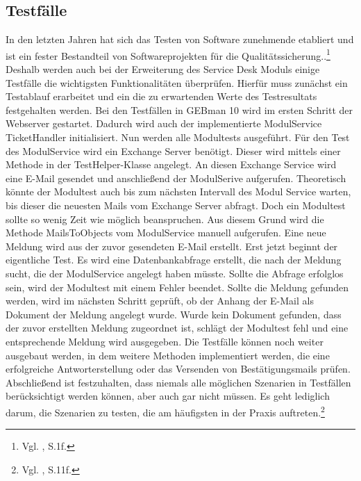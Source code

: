 \subsection{Testfälle}
\noindent
In den letzten Jahren hat sich das Testen von Software zunehmende etabliert und ist ein fester Bestandteil von Softwareprojekten für die Qualitätssicherung..\footnote{Vgl.\citeauthor{Vivenzio} \citeyear{Vivenzio}, S.1f.} Deshalb werden auch bei der Erweiterung des Service Desk Moduls einige Testfälle die wichtigsten Funktionalitäten überprüfen. Hierfür muss zunächst ein Testablauf erarbeitet und ein die zu erwartenden Werte des Testresultats festgehalten werden.\newline
Bei den Testfällen in GEBman 10 wird im ersten Schritt der Webserver gestartet. Dadurch wird auch der implementierte ModulService TicketHandler initialisiert. Nun werden alle Modultests ausgeführt. Für den Test des ModulService wird ein Exchange Server benötigt. Dieser wird mittels einer Methode in der TestHelper-Klasse angelegt. An diesen Exchange Service wird eine E-Mail gesendet und anschließend der ModulSerive aufgerufen. Theoretisch könnte der Modultest auch bis zum nächsten Intervall des Modul Service warten, bis dieser die neuesten Mails vom Exchange Server abfragt. Doch ein Modultest sollte so wenig Zeit wie möglich beanspruchen. Aus diesem Grund wird die Methode MailsToObjects vom ModulService manuell aufgerufen. Eine neue Meldung wird aus der zuvor gesendeten E-Mail erstellt. Erst jetzt beginnt der eigentliche Test. Es wird eine Datenbankabfrage erstellt, die nach der Meldung sucht, die der ModulService angelegt haben müsste. Sollte die Abfrage erfolglos sein, wird der Modultest mit einem Fehler beendet. Sollte die Meldung gefunden werden, wird im nächsten Schritt geprüft, ob der Anhang der E-Mail als Dokument der Meldung angelegt wurde. Wurde kein Dokument gefunden, dass der zuvor erstellten Meldung zugeordnet ist, schlägt der Modultest fehl und eine entsprechende Meldung wird ausgegeben.\newline
Die Testfälle können noch weiter ausgebaut werden, in dem weitere Methoden implementiert werden, die eine erfolgreiche Antworterstellung oder das Versenden von Bestätigungsmails prüfen. Abschließend ist festzuhalten, dass niemals alle möglichen Szenarien in Testfällen berücksichtigt werden können, aber auch gar nicht müssen. Es geht lediglich darum, die Szenarien zu testen, die am häufigsten in der Praxis auftreten.\footnote{Vgl.\citeauthor{Witte} \citeyear{Witte}, S.11f.}


